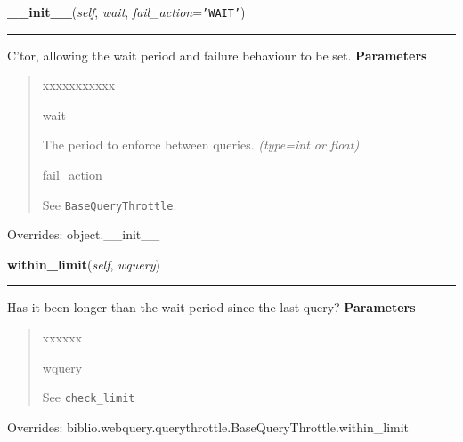 \hspace{.8\funcindent}\begin{boxedminipage}{\funcwidth}

    \raggedright \textbf{\_\_init\_\_}(\textit{self}, \textit{wait}, \textit{fail\_action}={\tt \texttt{'}\texttt{WAIT}\texttt{'}})

    \vspace{-1.5ex}

    \rule{\textwidth}{0.5\fboxrule}
\setlength{\parskip}{2ex}

C'tor, allowing the wait period and failure behaviour to be set.
\setlength{\parskip}{1ex}
      \textbf{Parameters}
      \vspace{-1ex}

      \begin{quote}
        \begin{Ventry}{xxxxxxxxxxx}

          \item[wait]


The period to enforce between queries.
            {\it (type=int or float)}

          \item[fail\_action]


See \texttt{BaseQueryThrottle}.
        \end{Ventry}

      \end{quote}

      Overrides: object.\_\_init\_\_

    \end{boxedminipage}

    \vspace{0.5ex}

\hspace{.8\funcindent}\begin{boxedminipage}{\funcwidth}

    \raggedright \textbf{within\_limit}(\textit{self}, \textit{wquery})

    \vspace{-1.5ex}

    \rule{\textwidth}{0.5\fboxrule}
\setlength{\parskip}{2ex}

Has it been longer than the wait period since the last query?
\setlength{\parskip}{1ex}
      \textbf{Parameters}
      \vspace{-1ex}

      \begin{quote}
        \begin{Ventry}{xxxxxx}

          \item[wquery]


See \texttt{check{\_}limit}
        \end{Ventry}

      \end{quote}

      Overrides: biblio.webquery.querythrottle.BaseQueryThrottle.within\_limit

    \end{boxedminipage}


